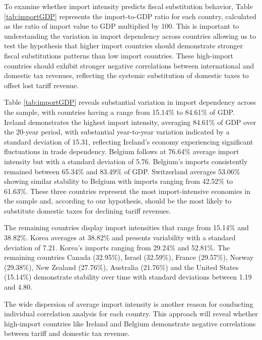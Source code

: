\documentclass[12pt]{article}
\begin{document}
\medskip
To examine whether import intensity predicts fiscal substitution behavior, Table \ref{tab:importGDP} represents the import-to-GDP ratio for each country, calculated as the ratio of import value to GDP multiplied by 100. This is important to understanding the variation in import dependency across countries allowing us to test the hypothesis that higher import countries should demonstrate stronger fiscal substitutions patterns than low import countries. These high-import countries should exhibit stronger negative correlations between international and domestic tax revenues, reflecting the systemic substitution of domestic taxes to offset lost tariff revenue. 



Table \ref{tab:importGDP} reveals substantial variation in import dependency across the sample, with countries having a range from 15.14\% to 84.61\% of GDP. Ireland demonstrates the highest import intensity, averaging 84.61\% of GDP over the 20-year period, with substantial year-to-year variation indicated by a standard deviation of 15.31, reflecting Ireland's economy experiencing significant fluctuations in trade dependency. Belgium follows at 76.64\%  average import intensity but with a standard deviation of 5.76. Belgium's imports consistently remained between 65.34\% and 83.49\% of GDP. Switzerland averages 53.06\% showing similar stability to Belgium with imports ranging from 42.52\% to 61.63\%. These three countries represent the most import-intensive economies in the sample and, according to our hypothesis, should be the most likely to substitute domestic taxes for declining tariff revenues.  
        
        The remaining countries display import intensities that range from 15.14\% and 38.82\%. Korea averages at 38.82\% and presents variability with a standard deviation of 7.21. Korea's imports ranging from 29.24\% and 52.81\%. The remaining countries Canada (32.95\%), Israel (32.59\%), France (29.57\%), Norway (29.38\%), New Zealand (27.76\%), Australia (21.76\%) and the United States (15.14\%) demonstrate stability over time with standard deviations between 1.19 and 4.80. 

        The wide dispersion of average import intensity is another reason for conducting individual correlation analysis for each country. This approach will reveal whether high-import countries like Ireland and Belgium demonstrate negative correlations between tariff and domestic tax revenue.
\end{document}
